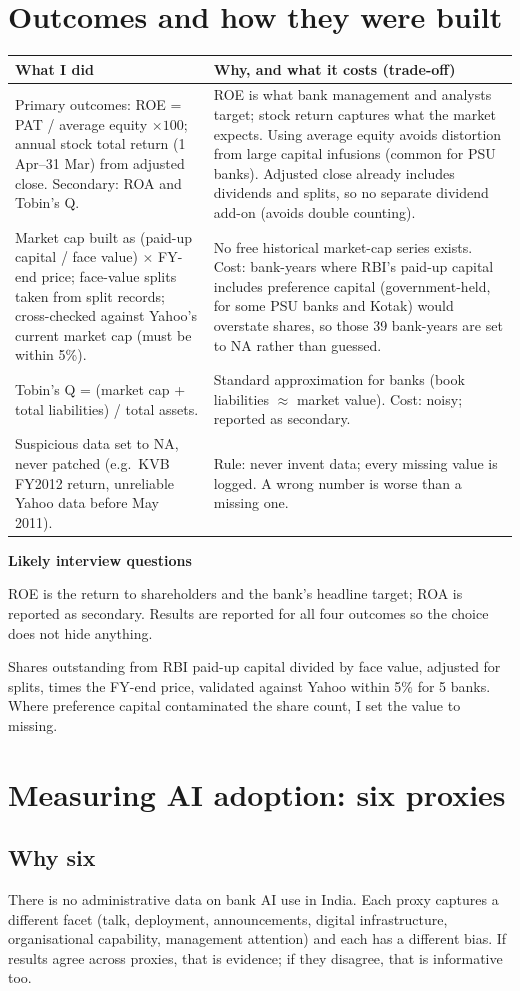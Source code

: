 \documentclass[10.5pt,a4paper]{article}
\newenvironment{decisions}{%
  \begin{longtable}{L{0.36\textwidth} L{0.58\textwidth}}
  \toprule
  \textcolor{head}{\textbf{What I did}} & \textcolor{head}{\textbf{Why, and what it costs (trade-off)}}\\
  \midrule\endhead}{%
  \end{longtable}}
\newcommand{\row}[2]{#1 & #2\\ \midrule}
\newenvironment{qa}{\par\noindent\textcolor{qcol}{\textbf{Likely interview questions}}\begin{description}[font=\normalfont\itshape,leftmargin=0pt,style=nextline]}{\end{description}}
\newcommand{\q}[2]{\item[``#1'']#2}
\begin{document}
\section{Outcomes and how they were built}
\begin{decisions}
\row{Primary outcomes: ROE = PAT / average equity $\times100$; annual stock total return (1 Apr--31 Mar) from
adjusted close. Secondary: ROA and Tobin's Q.}
{ROE is what bank management and analysts target; stock return captures what the market expects. Using average equity
avoids distortion from large capital infusions (common for PSU banks). Adjusted close already includes dividends and
splits, so no separate dividend add-on (avoids double counting).}
\row{Market cap built as (paid-up capital / face value) $\times$ FY-end price; face-value splits taken from split
records; cross-checked against Yahoo's current market cap (must be within 5\%).}
{No free historical market-cap series exists. Cost: bank-years where RBI's paid-up capital includes preference capital
(government-held, for some PSU banks and Kotak) would overstate shares, so those 39 bank-years are set to NA rather than
guessed.}
\row{Tobin's Q = (market cap + total liabilities) / total assets.}
{Standard approximation for banks (book liabilities $\approx$ market value). Cost: noisy; reported as secondary.}
\row{Suspicious data set to NA, never patched (e.g.\ KVB FY2012 return, unreliable Yahoo data before May 2011).}
{Rule: never invent data; every missing value is logged. A wrong number is worse than a missing one.}
\end{decisions}
\begin{qa}
\q{Why is ROE primary and not ROA?}{ROE is the return to shareholders and the bank's headline target; ROA is reported
as secondary. Results are reported for all four outcomes so the choice does not hide anything.}
\q{How did you get market capitalisation without Prowess?}{Shares outstanding from RBI paid-up capital divided by face
value, adjusted for splits, times the FY-end price, validated against Yahoo within 5\% for 5 banks. Where preference
capital contaminated the share count, I set the value to missing.}
\end{qa}

\section{Measuring AI adoption: six proxies}
\subsection*{Why six}
There is no administrative data on bank AI use in India. Each proxy captures a different facet (talk, deployment,
announcements, digital infrastructure, organisational capability, management attention) and each has a different
bias. If results agree across proxies, that is evidence; if they disagree, that is informative too.
\end{document}
